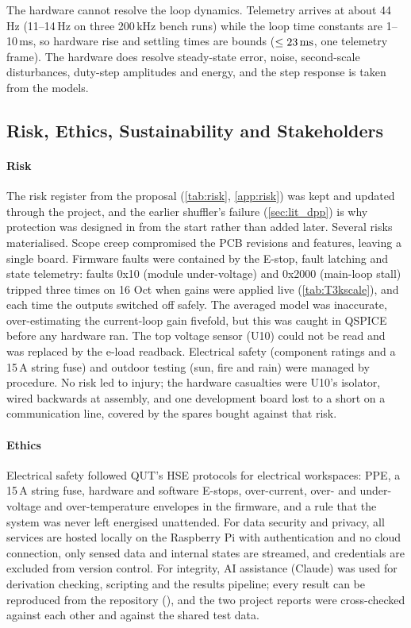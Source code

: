 The hardware cannot resolve the loop dynamics. Telemetry arrives at about 44\,Hz (11--14\,Hz on three 200\,kHz bench runs) while the loop time constants are 1--10\,ms, so hardware rise and settling times are bounds ($\le 23\,\mathrm{ms}$, one telemetry frame). The hardware does resolve steady-state error, noise, second-scale disturbances, duty-step amplitudes and energy, and the step response is taken from the models.

\subsection{Risk, Ethics, Sustainability and Stakeholders}
\label{sec:risks}
\paragraph{Risk}
The risk register from the proposal (\cref{tab:risk}, \cref{app:risk}) was kept and updated through the project, and the earlier shuffler's failure (\cref{sec:lit_dpp}) is why protection was designed in from the start rather than added later. Several risks materialised. Scope creep compromised the PCB revisions and features, leaving a single board. Firmware faults were contained by the E-stop, fault latching and state telemetry: faults 0x10 (module under-voltage) and 0x2000 (main-loop stall) tripped three times on 16 Oct when gains were applied live (\cref{tab:T3kscale}), and each time the outputs switched off safely. The averaged model was inaccurate, over-estimating the current-loop gain fivefold, but this was caught in QSPICE before any hardware ran. The top voltage sensor (U10) could not be read and was replaced by the e-load readback. Electrical safety (component ratings and a 15\,A string fuse) and outdoor testing (sun, fire and rain) were managed by procedure. No risk led to injury; the hardware casualties were U10's isolator, wired backwards at assembly, and one development board lost to a short on a communication line, covered by the spares bought against that risk.

\paragraph{Ethics}
Electrical safety followed QUT's HSE protocols for electrical workspaces: PPE, a 15\,A string fuse, hardware and software E-stops, over-current, over- and under-voltage and over-temperature envelopes in the firmware, and a rule that the system was never left energised unattended. For data security and privacy, all services are hosted locally on the Raspberry Pi with authentication and no cloud connection, only sensed data and internal states are streamed, and credentials are excluded from version control. For integrity, AI assistance (Claude) was used for derivation checking, scripting and the results pipeline; every result can be reproduced from the repository (), and the two project reports were cross-checked against each other and against the shared test data.

